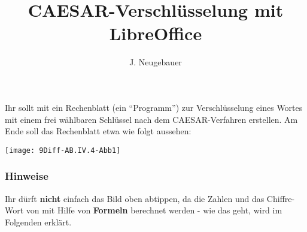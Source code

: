 \documentclass[10pt, a4paper]{scrartcl}
\author{J. Neugebauer}
\title{CAESAR-Verschlüsselung mit LibreOffice}
\date{\Heute}
\begin{document}
\ReiheTitel

\begin{aufgabe}
	Ihr sollt mit  ein Rechenblatt (ein \enquote{Programm}) zur Verschlüsselung eines Wortes mit einem frei wählbaren Schlüssel nach dem CAESAR-Verfahren erstellen. Am Ende soll das Rechenblatt etwa wie folgt aussehen:
	
	\begin{center}
	\texttt{[image: 9Diff-AB.IV.4-Abb1]}
	\end{center}
\end{aufgabe}

\subsubsection*{Hinweise}
Ihr dürft \textbf{nicht} einfach das Bild oben abtippen, da die Zahlen und das Chiffre-Wort von  mit Hilfe von \textbf{Formeln} berechnet werden - wie das geht, wird im Folgenden erklärt.
\end{document}
